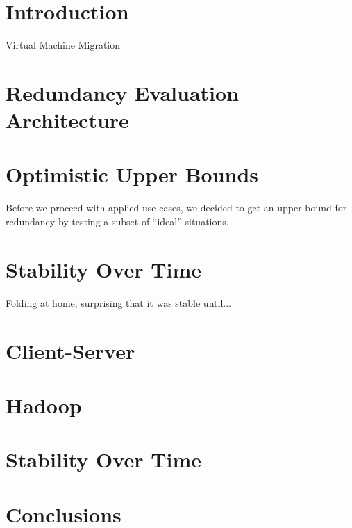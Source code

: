 \documentclass{acm_proc_article-sp}
\begin{document}

\section{Introduction}
Virtual Machine Migration \cite{live_gang}

\section{Redundancy Evaluation Architecture}


\section{Optimistic Upper Bounds}
Before we proceed with applied use cases, we decided to get an upper bound for redundancy by testing a subset of ``ideal'' situations.



\section{Stability Over Time}
Folding at home, surprising that it was stable until...

\section{Client-Server}

\section{Hadoop}

\section{Stability Over Time}

\section{Conclusions}



\end{document}
